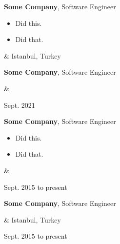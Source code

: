 \documentclass[10pt, letterpaper]{article}
\newenvironment{highlights}{
        \begin{itemize}[
                topsep=0pt,
                parsep=0.10 cm,
                partopsep=0pt,
                itemsep=0pt,
                after=\relax,
                leftmargin=0.4 cm + 3pt
            ]
    }{
        \end{itemize}
    } %
\let\originalTabularx\tabularx
\let\originalEndTabularx\endtabularx
\renewenvironment{tabularx}{\bgroup\centering\originalTabularx}{\originalEndTabularx\par\egroup}
\begin{document}
        \vspace{0.2 cm}
        \begin{tabularx}{
            \textwidth-0.4 cm-0.13cm
        }{
            K{0.2 cm}
            R{4.1 cm}
        }
            \textbf{Some Company}, Software Engineer

            \vspace{0.10 cm}

            \begin{highlights}
                \item Did this.
                \item Did that.
            \end{highlights}
            &
            Istanbul, Turkey

            
        \end{tabularx}

        \vspace{0.2 cm}
        \begin{tabularx}{
            \textwidth-0.4 cm-0.13cm
        }{
            K{0.2 cm}
            R{4.1 cm}
        }
            \textbf{Some Company}, Software Engineer

            \vspace{0.10 cm}

            &
            

            Sept. 2021
        \end{tabularx}

        \vspace{0.2 cm}
        \begin{tabularx}{
            \textwidth-0.4 cm-0.13cm
        }{
            K{0.2 cm}
            R{4.1 cm}
        }
            \textbf{Some Company}, Software Engineer

            \vspace{0.10 cm}

            \begin{highlights}
                \item Did this.
                \item Did that.
            \end{highlights}
            &
            

            Sept. 2015 to present
        \end{tabularx}

        \vspace{0.2 cm}
        \begin{tabularx}{
            \textwidth-0.4 cm-0.13cm
        }{
            K{0.2 cm}
            R{4.1 cm}
        }
            \textbf{Some Company}, Software Engineer

            \vspace{0.10 cm}

            &
            Istanbul, Turkey

            Sept. 2015 to present
        \end{tabularx}
\end{document}
